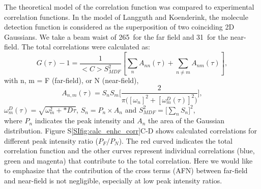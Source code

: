 The theoretical model of the correlation function was compared to experimental correlation functions. In the model of Langguth and Koenderink\cite{langguth2016exact}, the molecule detection function is considered as the superposition of two coinciding 2D Gaussians. We take a beam waist of 265~\nm for the far field and 31~\nm for the near-field. The total correlations were calculated as:
\begin{equation}
	G(\tau)-1 = \frac{1}{<C>S_{MDF}^2}[\sum_{n}A_{nn}(\tau) + \sum_{n\neq m}A_{nm}(\tau)],
	\label{eq:far-near-gauss}
\end{equation}
with n, m = F (far-field), or N (near-field),
\begin{equation}
	A_{n,m}(\tau)=S_nS_m\Bigg[\frac{2}{\pi\Big([\omega_n]^2 + [\omega_m^D(\tau)]^2 \Big)}\Bigg] ,
	\label{eq:area-gauss}
\end{equation}
$\omega_m^D(\tau)=\sqrt{\omega_m^2 + *D\tau}$, $S_n=P_n\times A_n$ and $S_{MDF}^2=\Big[\sum_{n}S_n\Big]^2$,\\
where $P_n$ indicates the peak intensity and $A_n$ the area of the Gaussian distribution. Figure S\ref{SIfig:calc_enhc_corr}C-D shows calculated correlations for different peak intensity ratio ($P_F/P_N$). The red curved indicates the total correlation function and the other curves represent individual correlations (blue, green and magenta) that contribute to the total correlation. Here we would like to emphasize that the contribution of the cross terms (AFN) between far-field and near-field is not negligible, especially at low peak intensity ratios.

